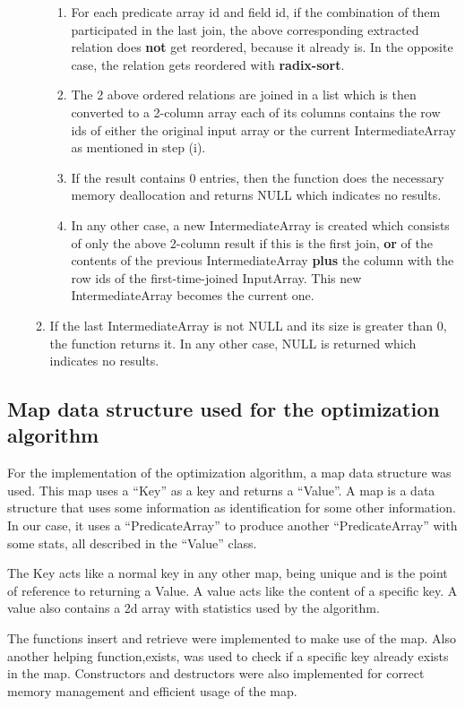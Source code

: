 \documentclass{ws-ijprai}
\begin{document}
\begin{enumerate}
\begin{enumerate}
\begin{enumerate}
            \item For each predicate array id and field id, if the combination of them participated in the last join, the above corresponding extracted relation does \textbf{not} get reordered, because it already is. In the opposite case, the relation gets reordered with \textbf{radix-sort}.
            \item The 2 above ordered relations are joined in a list which is then converted to a 2-column array each of its columns contains the row ids of either the original input array or the current IntermediateArray as mentioned in step (i).
            \item If the result contains 0 entries, then the function does the necessary memory deallocation and returns NULL which indicates no results.
            \item In any other case, a new IntermediateArray is created which consists of only the above 2-column result if this is the first join, \textbf{or} of the contents of the previous IntermediateArray \textbf{plus} the column with the row ids of the first-time-joined InputArray. This new IntermediateArray becomes the current one.
        \end{enumerate}
        \item If the last IntermediateArray is not NULL and its size is greater than 0, the function returns it. In any other case, NULL is returned which indicates no results.
    \end{enumerate}
\end{enumerate}

\subsection{Map data structure used for the optimization algorithm}
\tab For the implementation of the optimization algorithm, a map data structure was used. This map uses a “Key” as a key and returns a “Value”. A map is a data structure that uses some information as identification for some other information. In our case, it uses a “PredicateArray” to produce another “PredicateArray” with some stats, all described in the “Value” class.

\tab The Key acts like a normal key in any other map, being unique and is the point of reference to returning a Value. A value acts like the content of a specific key. A value also contains a 2d array with statistics used by the algorithm.

\tab The functions insert and retrieve were implemented to make use of the map. Also another helping function,exists, was used to check if a specific key already exists in the map. Constructors and destructors were also implemented for correct memory management and efficient usage of the map.
\end{document}
